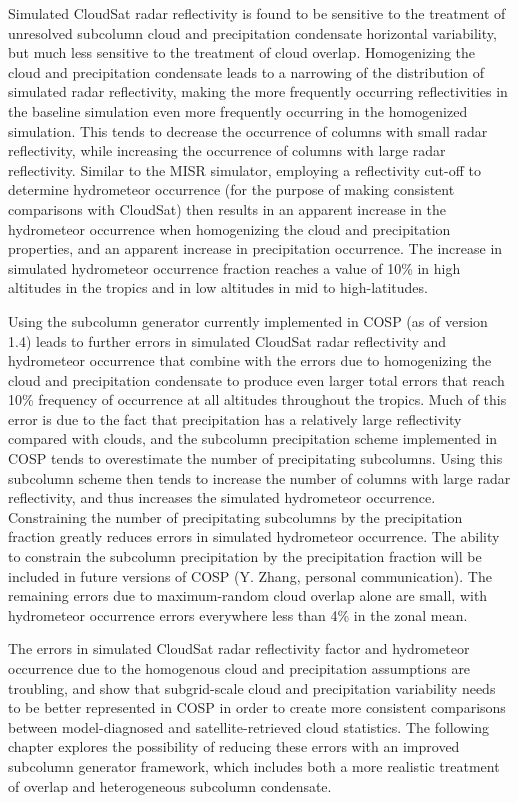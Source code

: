 Simulated CloudSat radar reflectivity is found to be sensitive to the treatment of unresolved subcolumn cloud and precipitation condensate horizontal variability, but much less sensitive to the treatment of cloud overlap. Homogenizing the cloud and precipitation condensate leads to a narrowing of the distribution of simulated radar reflectivity, making the more frequently occurring reflectivities in the baseline simulation even more frequently occurring in the homogenized simulation. This tends to decrease the occurrence of columns with small radar reflectivity, while increasing the occurrence of columns with large radar reflectivity. Similar to the MISR simulator, employing a reflectivity cut-off to determine hydrometeor occurrence (for the purpose of making consistent comparisons with CloudSat) then results in an apparent increase in the hydrometeor occurrence when homogenizing the cloud and precipitation properties, and an apparent increase in precipitation occurrence. The increase in simulated hydrometeor occurrence fraction reaches a value of 10\% in high altitudes in the tropics and in low altitudes in mid to high-latitudes.  

Using the subcolumn generator currently implemented in COSP (as of version 1.4) leads to further errors in simulated CloudSat radar reflectivity and hydrometeor occurrence that combine with the errors due to homogenizing the cloud and precipitation condensate to produce even larger total errors that reach 10\% frequency of occurrence at all altitudes throughout the tropics. Much of this error is due to the fact that precipitation has a relatively large reflectivity compared with clouds, and the subcolumn precipitation scheme implemented in COSP tends to overestimate the number of precipitating subcolumns. Using this subcolumn scheme then tends to increase the number of columns with large radar reflectivity, and thus increases the simulated hydrometeor occurrence.  Constraining the number of precipitating subcolumns by the precipitation fraction greatly reduces errors in simulated hydrometeor occurrence. The ability to constrain the subcolumn precipitation by the precipitation fraction will be included in future versions of COSP (Y. Zhang, personal communication). The remaining errors due to maximum-random cloud overlap alone are small, with hydrometeor occurrence errors everywhere less than 4\% in the zonal mean.

The errors in simulated CloudSat radar reflectivity factor and hydrometeor occurrence due to the homogenous cloud and precipitation assumptions are troubling, and show that subgrid-scale cloud and precipitation variability needs to be better represented in COSP in order to create more consistent comparisons between model-diagnosed and satellite-retrieved cloud statistics. The following chapter explores the possibility of reducing these errors with an improved subcolumn generator framework, which includes both a more realistic treatment of overlap and heterogeneous subcolumn condensate.

